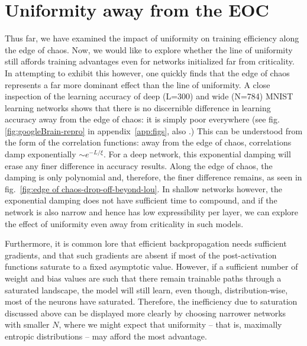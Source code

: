 \section{Uniformity away from the EOC}
Thus far, we have examined the impact of uniformity on training efficiency along the edge of chaos. Now, we would like to explore whether the line of uniformity still affords training advantages even for networks initialized far from criticality. In attempting to exhibit this however, one quickly finds that the edge of chaos represents a far more dominant effect than the line of uniformity. A close inspection of the learning accuracy of deep (L=300) and wide (N=784) MNIST learning networks shows that there is no discernible difference in learning accuracy away from the edge of chaos: it is simply poor everywhere (see fig. \ref{fig:googleBrain-repro} in appendix~\ref{app:figs}, also \cite{2016arXiv161101232S}.) This can be understood from the form of the correlation functions: away from the edge of chaos, correlations damp exponentially $\sim e^{-L/\xi}$. For a deep network, this exponential damping will erase any finer difference in accuracy results. Along the edge of chaos, the damping is only polynomial and, therefore, the finer difference remains, as seen in fig.~\ref{fig:edge of chaos-drop-off-beyond-lou}. In shallow networks however, the exponential damping does not have sufficient time to compound, and if the network is also narrow and hence has low expressibility per layer, we can explore the effect of uniformity even away from criticality in such models.

Furthermore, it is common lore that efficient backpropagation needs sufficient gradients, and that such gradients are absent if most of the post-activation functions saturate to a fixed asymptotic value. However, if a sufficient number of weight and bias values are such that there remain trainable paths through a saturated landscape, the model will still learn, even though, distribution-wise, most of the neurons have saturated. Therefore, the inefficiency due to saturation discussed above
can be displayed more clearly  
by choosing narrower networks with smaller $N$, where we might expect that uniformity -- that is, maximally entropic distributions -- may afford the most advantage.

